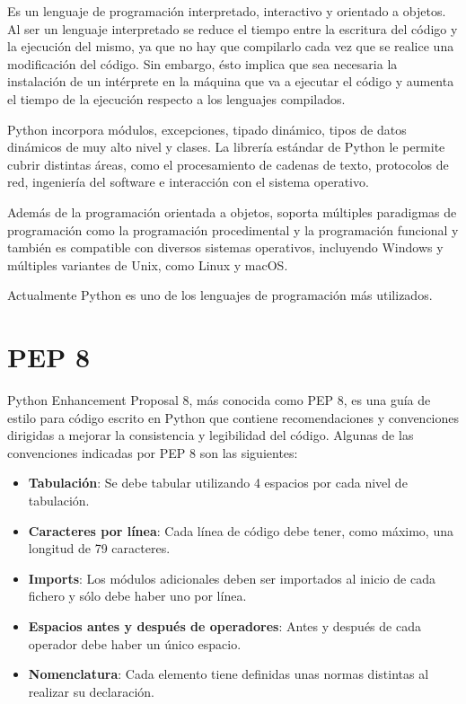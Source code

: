 \documentclass[a4paper, 12pt]{book}
\begin{document}
Es un lenguaje de programación interpretado, interactivo y orientado a objetos. Al ser un lenguaje interpretado se reduce el tiempo entre la escritura del código y la ejecución del mismo, ya que no hay que compilarlo cada vez que se realice una modificación del código. Sin embargo, ésto implica que sea necesaria la instalación de un intérprete en la máquina que va a ejecutar el código y aumenta el tiempo de la ejecución respecto a los lenguajes compilados.

Python incorpora módulos, excepciones, tipado dinámico, tipos de datos dinámicos de muy alto nivel y clases. La librería estándar de Python le permite cubrir distintas áreas, como el procesamiento de cadenas de texto, protocolos de red, ingeniería del software e interacción con el sistema operativo.

Además de la programación orientada a objetos, soporta múltiples paradigmas de programación como la programación procedimental y la programación funcional y también es compatible con diversos sistemas operativos, incluyendo Windows y múltiples variantes de Unix, como Linux y macOS.

Actualmente Python es uno de los lenguajes de programación más utilizados.\cite{stackoverflowsurvey}

\section{PEP 8} 
\label{sec:pep8}
Python Enhancement Proposal 8, más conocida como PEP 8\cite{pep8}, es una guía de estilo para código escrito en Python que contiene recomendaciones y convenciones dirigidas a mejorar la consistencia y legibilidad del código.
Algunas de las convenciones indicadas por PEP 8 son las siguientes:
\begin{itemize}
	\item \textbf{Tabulación}: Se debe tabular utilizando 4 espacios por cada nivel de tabulación.
	\item \textbf{Caracteres por línea}: Cada línea de código debe tener, como máximo, una longitud de 79 caracteres.
	\item \textbf{Imports}: Los módulos adicionales deben ser importados al inicio de cada fichero y sólo debe haber uno por línea.
	\item \textbf{Espacios antes y después de operadores}: Antes y después de cada operador debe haber un único espacio.
	\item \textbf{Nomenclatura}: Cada elemento tiene definidas unas normas distintas al realizar su declaración.
\end{itemize}
\end{document}
